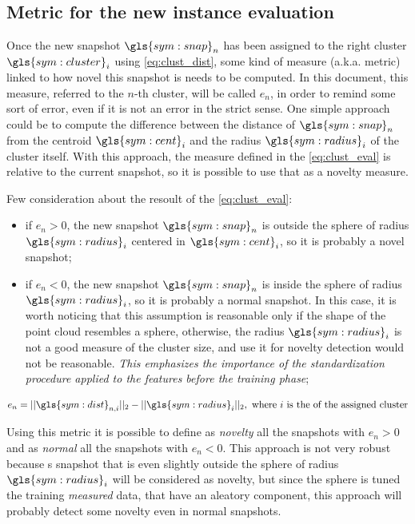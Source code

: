 \subsection{Metric for the new instance evaluation}
Once the new snapshot $\gls{sym:snap}_n$ has been assigned to the right cluster $\gls{sym:cluster}_i$ using \autoref{eq:clust_dist}, some kind of measure (a.k.a. metric) linked to how novel this snapshot is needs to be computed. In this document, this measure, referred to the $n$-th cluster, will be called $e_n$, in order to remind some sort of error, even if it is not an error in the strict sense. One simple approach could be to compute the difference between the distance of $\gls{sym:snap}_n$ from the centroid $\gls{sym:cent}_i$ and the radius $\gls{sym:radius}_i$ of the cluster itself. With this approach, the measure defined in the \autoref{eq:clust_eval} is relative to the current snapshot, so it is possible to use that as a novelty measure.

Few consideration about the resoult of the \autoref{eq:clust_eval}:
\begin{itemize}
  \item if $e_{n} > 0$, the new snapshot $\gls{sym:snap}_n$ is outside the sphere of radius $\gls{sym:radius}_i$ centered in $\gls{sym:cent}_i$, so it is probably a novel snapshot;
  \item if $e_{n} < 0$, the new snapshot $\gls{sym:snap}_n$ is inside the sphere of radius $\gls{sym:radius}_i$, so it is probably a normal snapshot. In this case, it is worth noticing that this assumption is reasonable only if the shape of the point cloud resembles a sphere, otherwise, the radius $\gls{sym:radius}_i$ is not a good measure of the cluster size, and use it for novelty detection would not be reasonable. \emph{This emphasizes the importance of the standardization procedure applied to the features before the training phase};
\end{itemize}

\begin{equation}
  \label{eq:clust_eval}
  e_{n} = ||\gls{sym:dist}_{n,i}||_2 - ||\gls{sym:radius}_{i}||_2, \text{ where $i$ is the of the assigned cluster}
\end{equation}

Using this metric it is possible to define as \emph{novelty} all the snapshots with $e_{n} > 0$ and as \emph{normal} all the snapshots with $e_{n} < 0$. This approach is not very robust because s snapshot that is even slightly outside the sphere of radius $\gls{sym:radius}_i$ will be considered as novelty, but since the sphere is tuned the training \emph{measured} data, that have an aleatory component, this approach will probably detect some novelty even in normal snapshots.

